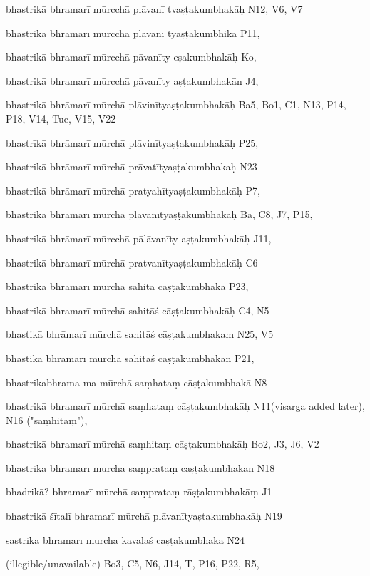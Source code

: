 \begin{ekdosis}
\begin{marma}[hp01_055]
\begin{marma}[hp02_009]
\begin{marma}[hp02_011]
\begin{marma}[hp02_44cd]
\item[bhastrikā bhramarī mūrcchā plāvanī tvaṣṭakumbhakāḥ] N12, V6, V7
\item[bhastrikā bhramarī mūrcchā plāvanī tyaṣṭakumbhikā] P11, 
\item[bhastrikā bhramarī mūrcchā pāvanīty eṣakumbhakāḥ] Ko,
\item[bhastrikā bhramarī mūrcchā pāvanīty aṣṭakumbhakān] J4,
\item[bhastrikā bhrāmarī mūrchā plāvinītyaṣṭakumbhakāḥ] Ba5, Bo1, C1, N13, P14, P18, V14, Tue, V15, V22
\item[bhastrīkā bhrāmarī mūrchā plāvinītyaṣṭakumbhakāḥ] P25,
\item[bhastrikā bhrāmarī mūrchā prāvatītyaṣṭakumbhakaḥ] N23
\item[bhastrikā bhrāmarī mūrchā pratyahītyaṣṭakumbhakāḥ] P7,  
\item[bhastrikā bhramarī mūrchā plāvanītyaṣṭakumbhakāḥ] Ba, C8, J7, P15,  
\item[bhastrikā bhrāmarī mūrcchā pālāvanīty aṣṭakumbhakāḥ] J11,
\item[bhastrikā bhramarī mūrchā pratvanītyaṣṭakumbhakāḥ] C6
\item[bhastrikā bhrāmarī mūrchā sahita cāṣṭakumbhakā] P23,
\item[bhastrikā bhramarī mūrchā sahitāś cāṣṭakumbhakāḥ] C4, N5
\item[bhastikā bhrāmarī mūrchā sahitāś cāṣṭakumbhakam] N25, V5
\item[bhastikā bhrāmarī mūrchā sahitāś cāṣṭakumbhakān] P21, 
\item[bhastrikabhrama ma mūrchā saṃhataṃ cāṣṭakumbhakā] N8
\item[bhastrikā bhramarī mūrchā saṃhataṃ cāṣṭakumbhakāḥ] N11(visarga added later), N16 ("saṃhitaṃ"),
\item[bhastrikā bhramarī mūrchā saṃhitaṃ cāṣṭakumbhakāḥ] Bo2, J3, J6, V2
\item[bhastrikā bhramarī mūrchā saṃprataṃ cāṣṭakumbhakān] N18
\item[bhadrikā? bhramarī mūrchā saṃprataṃ rāṣṭakumbhakāṃ] J1
\item[bhastrikā śītalī bhramarī mūrchā plāvanītyaṣtakumbhakāḥ] N19 
\item[sastrikā bhramarī mūrchā kavalaś cāṣṭakumbhakā] N24
\item[(illegible/unavailable)] Bo3, C5, N6, J14, T, P16, P22, R5,
  \begin{description}

    \end{description}
 \end{marma}


\end{marma}
\end{marma}
\end{marma}
\end{ekdosis}
